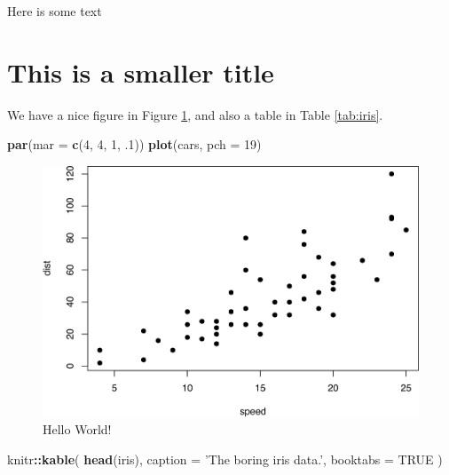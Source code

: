 \documentclass[]{krantz}
\makeatletter
\newenvironment{Shaded}{\begin{snugshade}}{\end{snugshade}}
\newcommand{\KeywordTok}[1]{\textcolor[rgb]{0.13,0.29,0.53}{\textbf{#1}}}
\newcommand{\DataTypeTok}[1]{\textcolor[rgb]{0.13,0.29,0.53}{#1}}
\newcommand{\DecValTok}[1]{\textcolor[rgb]{0.00,0.00,0.81}{#1}}
\newcommand{\StringTok}[1]{\textcolor[rgb]{0.31,0.60,0.02}{#1}}
\newcommand{\OtherTok}[1]{\textcolor[rgb]{0.56,0.35,0.01}{#1}}
\newcommand{\OperatorTok}[1]{\textcolor[rgb]{0.81,0.36,0.00}{\textbf{#1}}}
\newcommand{\NormalTok}[1]{#1}
\newenvironment{kframe}{%
\medskip{}
\setlength{\fboxsep}{.8em}
 \def\at@end@of@kframe{}%
 \ifinner\ifhmode%
  \def\at@end@of@kframe{\end{minipage}}%
  \begin{minipage}{\columnwidth}%
 \fi\fi%
 \def\FrameCommand##1{\hskip\@totalleftmargin \hskip-\fboxsep
 \colorbox{shadecolor}{##1}\hskip-\fboxsep
     \hskip-\linewidth \hskip-\@totalleftmargin \hskip\columnwidth}%
 \MakeFramed {\advance\hsize-\width
   \@totalleftmargin\z@ \linewidth\hsize
   \@setminipage}}%
 {\par\unskip\endMakeFramed%
 \at@end@of@kframe}
\renewenvironment{Shaded}{\begin{kframe}}{\end{kframe}}
\makeatother
\begin{document}
Here is some text

\section{This is a smaller title}\label{this-is-a-smaller-title}

We have a nice figure in Figure \ref{fig:hello}, and also a table in
Table \ref{tab:iris}.

\begin{Shaded}
\begin{Highlighting}[]
\KeywordTok{par}\NormalTok{(}\DataTypeTok{mar =} \KeywordTok{c}\NormalTok{(}\DecValTok{4}\NormalTok{, }\DecValTok{4}\NormalTok{, }\DecValTok{1}\NormalTok{, .}\DecValTok{1}\NormalTok{))}
\KeywordTok{plot}\NormalTok{(cars, }\DataTypeTok{pch =} \DecValTok{19}\NormalTok{)}
\end{Highlighting}
\end{Shaded}

\begin{figure}
\includegraphics[width=0.9\linewidth]{book_files/figure-latex/hello-1} \caption{Hello World!}\label{fig:hello}
\end{figure}

\begin{Shaded}
\begin{Highlighting}[]
\NormalTok{knitr}\OperatorTok{::}\KeywordTok{kable}\NormalTok{(}
  \KeywordTok{head}\NormalTok{(iris), }\DataTypeTok{caption =} \StringTok{'The boring iris data.'}\NormalTok{,}
  \DataTypeTok{booktabs =} \OtherTok{TRUE}
\NormalTok{)}
\end{Highlighting}
\end{Shaded}
\end{document}
